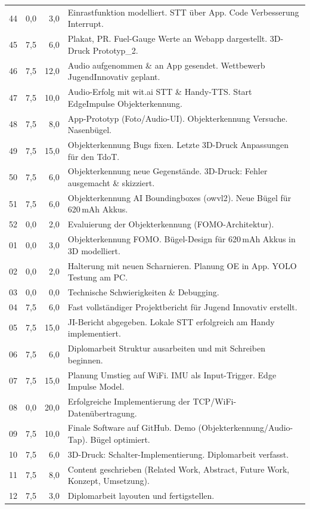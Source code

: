 \begin{longtable}{l r r p{\dimexpr\textwidth-4.5cm\relax}}
44 & 0,0 & 3,0 & Einrastfunktion modelliert. STT über App. Code Verbesserung Interrupt. \\
45 & 7,5 & 6,0 & Plakat, PR. Fuel-Gauge Werte an Webapp dargestellt. 3D-Druck Prototyp\_2. \\
46 & 7,5 & 12,0 & Audio aufgenommen \& an App gesendet. Wettbewerb JugendInnovativ geplant. \\
47 & 7,5 & 10,0 & Audio-Erfolg mit wit.ai STT \& Handy-TTS. Start EdgeImpulse Objekterkennung. \\
48 & 7,5 & 8,0 & App-Prototyp (Foto/Audio-UI). Objekterkennung Versuche. Nasenbügel. \\
49 & 7,5 & 15,0 & Objekterkennung Bugs fixen. Letzte 3D-Druck Anpassungen für den TdoT. \\
50 & 7,5 & 6,0 & Objekterkennung neue Gegenstände. 3D-Druck: Fehler ausgemacht \& skizziert. \\
51 & 7,5 & 6,0 & Objekterkennung AI Boundingboxes (owvl2). Neue Bügel für 620\,mAh Akkus. \\
52 & 0,0 & 2,0 & Evaluierung der Objekterkennung (FOMO-Architektur). \\
01 & 0,0 & 3,0 & Objekterkennung FOMO. Bügel-Design für 620\,mAh Akkus in 3D modelliert. \\
02 & 0,0 & 2,0 & Halterung mit neuen Scharnieren. Planung OE in App. YOLO Testung am PC. \\
03 & 0,0 & 0,0 & Technische Schwierigkeiten \& Debugging. \\
04 & 7,5 & 6,0 & Fast vollständiger Projektbericht für Jugend Innovativ erstellt. \\
05 & 7,5 & 15,0 & JI-Bericht abgegeben. Lokale STT erfolgreich am Handy implementiert. \\
06 & 7,5 & 6,0 & Diplomarbeit Struktur ausarbeiten und mit Schreiben beginnen. \\
07 & 7,5 & 15,0 & Planung Umstieg auf WiFi. IMU als Input-Trigger. Edge Impulse Model. \\
08 & 0,0 & 20,0 & Erfolgreiche Implementierung der TCP/WiFi-Datenübertragung. \\
09 & 7,5 & 10,0 & Finale Software auf GitHub. Demo (Objekterkennung/Audio-Tap). Bügel optimiert. \\
10 & 7,5 & 6,0 & 3D-Druck: Schalter-Implementierung. Diplomarbeit verfasst. \\
11 & 7,5 & 8,0 & Content geschrieben (Related Work, Abstract, Future Work, Konzept, Umsetzung). \\
12 & 7,5 & 3,0 & Diplomarbeit layouten und fertigstellen. \\
\end{longtable}
\newpage

